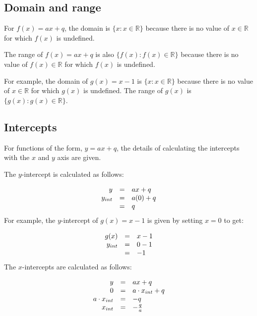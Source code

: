 \subsection*{Domain and range}
\nopagebreak
For $f(x)=ax+q$, the domain is $\{x:x\in \mathbb{R}\}$ because there is no value of $x\in \mathbb{R}$ for which $f(x)$ is undefined.\par 
The range of $f(x)=ax+q$ is also $\{f(x):f(x)\in \mathbb{R}\}$ because there is no value of $f(x)\in \mathbb{R}$ for which $f(x)$ is undefined.\par 
For example, the domain of $g(x)=x-1$ is $\{x:x\in \mathbb{R}\}$ because there is no value of $x\in \mathbb{R}$ for which $g(x)$ is undefined. The range of $g(x)$ is $\{g(x):g(x)\in \mathbb{R}\}$.\par 

\subsection*{Intercepts}
\nopagebreak
For functions of the form, $y=ax+q$, the details of calculating the intercepts with the $x$ and $y$ axis are given.\par 
The $y$-intercept is calculated as follows:\par 
\nopagebreak\noindent{}
\begin{equation*}
\begin{array}{ccc}\hfill y& =& ax+q\hfill \\ \hfill {y}_{int}& =& a(0)+q\hfill \\ & =& q\hfill \end{array}
\end{equation*}
For example, the $y$-intercept of $g(x)=x-1$ is given by setting $x=0$ to get:\par 
\nopagebreak\noindent{}
\begin{equation*}
\begin{array}{ccc}\hfill g(x)& =& x-1\hfill \\ \hfill {y}_{int}& =& 0-1\hfill \\ & =& -1\hfill \end{array}
\end{equation*}
The $x$-intercepts are calculated as follows:\par 
\nopagebreak\noindent{}
\begin{equation*}
\begin{array}{ccc}\hfill y& =& ax+q\hfill \\ \hfill 0& =& a\ensuremath{\cdot}{x}_{int}+q\hfill \\ \hfill a\ensuremath{\cdot}{x}_{int}& =& -q\hfill \\ \hfill {x}_{int}& =& -\frac{q}{a}\hfill \end{array}
\end{equation*}
